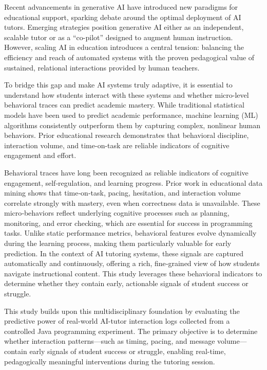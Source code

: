 \documentclass[conference]{IEEEtran}
\begin{document}
Recent advancements in generative AI have introduced new paradigms for educational support, sparking debate around the optimal deployment of AI tutors. Emerging strategies position generative AI either as an independent, scalable tutor or as a ``co-pilot'' designed to augment human instruction. However, scaling AI in education introduces a central tension: balancing the efficiency and reach of automated systems with the proven pedagogical value of sustained, relational interactions provided by human teachers.

To bridge this gap and make AI systems truly adaptive, it is essential to understand how students interact with these systems and whether micro-level behavioral traces can predict academic mastery. While traditional statistical models have been used to predict academic performance, machine learning (ML) algorithms consistently outperform them by capturing complex, nonlinear human behaviors. Prior educational research demonstrates that behavioral discipline, interaction volume, and time-on-task are reliable indicators of cognitive engagement and effort.

Behavioral traces have long been recognized as reliable indicators of cognitive engagement, self‑regulation, and learning progress. Prior work in educational data mining shows that time‑on‑task, pacing, hesitation, and interaction volume correlate strongly with mastery, even when correctness data is unavailable. These micro‑behaviors reflect underlying cognitive processes such as planning, monitoring, and error checking, which are essential for success in programming tasks. Unlike static performance metrics, behavioral features evolve dynamically during the learning process, making them particularly valuable for early prediction. In the context of AI tutoring systems, these signals are captured automatically and continuously, offering a rich, fine‑grained view of how students navigate instructional content. This study leverages these behavioral indicators to determine whether they contain early, actionable signals of student success or struggle.

This study builds upon this multidisciplinary foundation by evaluating the predictive power of real-world AI-tutor interaction logs collected from a controlled Java programming experiment. The primary objective is to determine whether interaction patterns—such as timing, pacing, and message volume—contain early signals of student success or struggle, enabling real-time, pedagogically meaningful interventions during the tutoring session.
\end{document}
